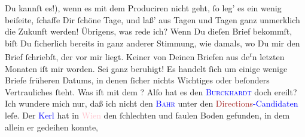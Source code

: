                Du kannſt es!), {\pb}wenn es mit  dem Produciren nicht geht, ſo leg’ es ein wenig beiſeite, ſchaffe Dir ſchöne
               Tage, und laß’ aus Tagen und Tagen ganz unmerklich die Zukunft werden!{\dotsfour}\pend
           \pstart
           Übrigens, was rede ich? Wenn Du dieſen Brief bekommſt, biſt Du ſicherlich bereits in
               ganz anderer Stimmung, wie damals, wo Du mir  den Brief ſchriebſt, der vor mir liegt.\pend
           \pstart
           Keiner von Deinen Briefen aus de\substVorne{}\textsuperscript{r}\substDazwischen{}n\substHinten{} letzten Monaten iſt mir \label{K_L02834-3v}\label{K_L02834-3h} worden. Sei ganz beruhigt! Es handelt ſich um einige wenige Briefe früheren
               Datums, in denen ſicher nichts Wichtiges oder beſonders Vertrauliches ſteht.\pend
           \pstart
           {\pb}Was iſt mit dem \label{K_L02834-4v}\label{K_L02834-4h}? Alſo hat es den \textsc{\textcolor{blue}{Burckhardt}{}\ledrightnote{\textcolor{blue}{Max Eugen Burckhard}}} doch  ereilt? Ich wundere mich nur, daß ich
               nicht den \textsc{\textcolor{blue}{Bahr}{}\ledrightnote{\textcolor{blue}{Hermann Bahr}}} unter den \textcolor{blue}{\textcolor{brown}{Directions}{}-Candidaten}{}
               leſe. Der \textcolor{blue}{Kerl}{} hat in \textcolor{pink}{Wien}{}\ledrightnote{\textcolor{pink}{Wien}}{ } den ſchlechten und faulen Boden gefunden, in dem allein er gedeihen konnte,
